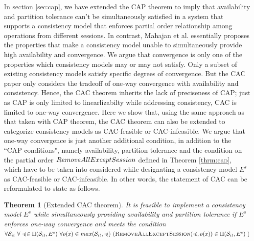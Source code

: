\documentclass[journal,compsoc]{IEEEtran}
\newtheorem{theorem}{Theorem}[section]
\begin{document}
 In section  \ref{sec:cap}, we have extended the CAP theorem to imply that availability and partition tolerance can't be simultaneously satisfied in a system that supports  a consistency model that enforces partial order relationship among operations from different sessions.  In contrast, Mahajan et al. essentially proposes the properties that make a consistency model unable to simultaneously provide high availability and convergence.   We argue that convergence is only one of  the properties which consistency models may or may not satisfy. Only a subset of existing consistency models satisfy specific degrees of convergence. But the CAC paper only considers the tradeoff of one-way convergence with availability and consistency. Hence, the CAC theorem inherits the lack of preciseness of CAP; just as CAP is only limited to linearlizabilty while addressing consistency, CAC is limited to one-way convergence. Here we show that, using the same approach as that taken with CAP theorem, the CAC theorem can also be extended to categorize consistency models as CAC-feasible or CAC-infeasible. We argue that one-way convergence is just another additional condition, in addition to the ``CAP-conditions", namely availability, partition tolerance and the condition on the partial order ${\sc RemoveAllExceptSession}$ defined in Theorem \ref{thrm:cap}, which have to be taken into considered while designating a consistency model $E^s$ as CAC-feasible or CAC-infeasible.  In other words, the statement of CAC can be reformulated to state as follows.  
  \begin{theorem}[Extended CAC theorem] 
  It is feasible to implement a consistency model $E^s$ while simultaneously providing availability and partition tolerance if  $E^s$ enforces one-way convergence and  meets the condition  \noindent $\forall \mathcal{S}_{it} ~ \forall \preccurlyeq \in \Pi(\mathcal{S}_{it},E^s) ~ \forall o(x) \in max(\mathcal{S}_{it}, \preccurlyeq) ~ (\textsc{RemoveAllExceptSession}(\preccurlyeq,o(x)) \in \Pi(\mathcal{S}_{it},E^s) ~ ) $ %
   \end{theorem} \label{thrm:cac}%
 \par %
\end{document}
